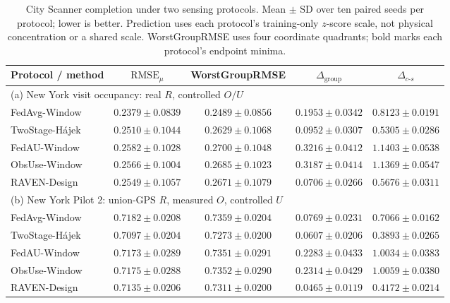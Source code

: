 \documentclass[letterpaper,journal]{IEEEtran}
\begin{document}
\begin{table}[t]
\centering
\caption{City Scanner completion under two sensing protocols.
Mean $\pm$ SD over ten paired seeds per protocol; lower is better.
Prediction uses each protocol's training-only $z$-score scale, not physical
concentration or a shared scale. WorstGroupRMSE uses four coordinate
quadrants; bold marks each protocol's endpoint minima.}
\label{tab:cityscanner_real}
\label{tab:cityscanner_hybrid}
\label{tab:cityscanner_p2_measured_o}
\footnotesize
\begin{tabular*}{\textwidth}{@{\extracolsep{\fill}}lcccc@{}}
\toprule
Protocol / method & $\mathrm{RMSE}_{\mu}$ & WorstGroupRMSE & $\Delta_{\mathrm{group}}$ & $\Delta_{c\text{-}s}$\\
\midrule
\multicolumn{5}{l}{(a) New York visit occupancy: real $R$, controlled $O/U$}\\
FedAvg-Window & $\mathbf{0.2379}{\pm}0.0839$ & $\mathbf{0.2489}{\pm}0.0856$ & $0.1953{\pm}0.0342$ & $0.8123{\pm}0.0191$\\
TwoStage-H\'ajek & $0.2510{\pm}0.1044$ & $0.2629{\pm}0.1068$ & $0.0952{\pm}0.0307$ & $\mathbf{0.5305}{\pm}0.0286$\\
FedAU-Window & $0.2582{\pm}0.1028$ & $0.2700{\pm}0.1048$ & $0.3216{\pm}0.0412$ & $1.1403{\pm}0.0538$\\
ObsUse-Window & $0.2566{\pm}0.1004$ & $0.2685{\pm}0.1023$ & $0.3187{\pm}0.0414$ & $1.1369{\pm}0.0547$\\
RAVEN-Design & $0.2549{\pm}0.1057$ & $0.2671{\pm}0.1079$ & $\mathbf{0.0706}{\pm}0.0266$ & $0.5676{\pm}0.0311$\\
\midrule
\multicolumn{5}{l}{(b) New York Pilot 2: union-GPS $R$, measured $O$, controlled $U$}\\
FedAvg-Window & $0.7182{\pm}0.0208$ & $0.7359{\pm}0.0204$ & $0.0769{\pm}0.0231$ & $0.7066{\pm}0.0162$\\
TwoStage-H\'ajek & $\mathbf{0.7097}{\pm}0.0204$ & $\mathbf{0.7273}{\pm}0.0200$ & $0.0607{\pm}0.0206$ & $\mathbf{0.3893}{\pm}0.0265$\\
FedAU-Window & $0.7173{\pm}0.0289$ & $0.7351{\pm}0.0291$ & $0.2283{\pm}0.0433$ & $1.0034{\pm}0.0383$\\
ObsUse-Window & $0.7175{\pm}0.0288$ & $0.7352{\pm}0.0290$ & $0.2314{\pm}0.0429$ & $1.0059{\pm}0.0380$\\
RAVEN-Design & $0.7135{\pm}0.0206$ & $0.7311{\pm}0.0200$ & $\mathbf{0.0465}{\pm}0.0119$ & $0.4172{\pm}0.0214$\\
\bottomrule
\end{tabular*}
\end{table}
\end{document}
